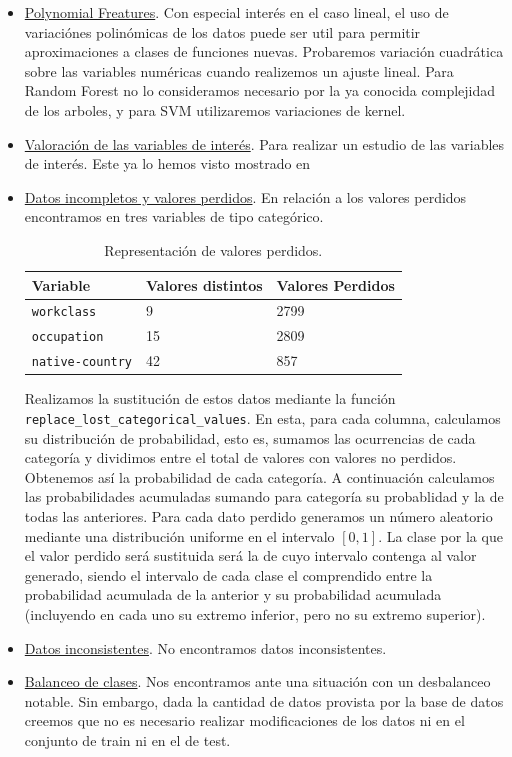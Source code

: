 \documentclass[11pt,a4paper]{article}
\begin{document}
\begin{itemize}
\begin{itemize}
\end{itemize}
\newpage
\item  \underline{Polynomial Freatures}. Con especial interés en el caso lineal, el uso de variaciónes polinómicas de los datos puede ser util para permitir aproximaciones a clases de funciones nuevas. Probaremos variación cuadrática sobre las variables numéricas cuando realizemos un ajuste lineal. Para Random Forest no lo consideramos necesario por la ya conocida complejidad de los arboles, y para SVM utilizaremos variaciones de kernel. \\
	
	\item \underline{Valoración de las variables de interés}. Para realizar un estudio de las variables de interés. Este ya lo hemos visto mostrado en 
	\item \underline{Datos incompletos y valores perdidos}. En relación a los valores perdidos encontramos en tres variables de tipo categórico.\\
	
\begin{table}[h]
\begin{center}
\begin{tabular}{|l|ll|}
\hline
Variable& Valores distintos & Valores Perdidos\\ \hline
\texttt{workclass} & 9 & 2799\\
\texttt{occupation} & 15 & 2809\\
\texttt{native-country} & 42 & 857\\\hline
\end{tabular}
\end{center}
\caption{Representación de valores perdidos.}
	\end{table}
	
	Realizamos la sustitución de estos datos mediante la función \texttt{replace\_lost\_categorical\_values}. En esta, para cada columna, calculamos su distribución de probabilidad, esto es, sumamos las ocurrencias de cada categoría y dividimos entre el total de valores con valores no perdidos. Obtenemos así la probabilidad de cada categoría. A continuación calculamos las probabilidades acumuladas sumando para categoría su probablidad y la de todas las anteriores. Para cada dato perdido generamos un número aleatorio mediante una distribución uniforme en el intervalo $[0,1]$. La clase por la que el valor perdido será sustituida será la de cuyo intervalo contenga al valor generado, siendo el intervalo de cada clase el comprendido entre la probabilidad acumulada de la anterior y su probabilidad acumulada (incluyendo en cada uno su extremo inferior, pero no su extremo superior).
	
	\item \underline{Datos inconsistentes}. No encontramos datos inconsistentes.
	\item \underline{Balanceo de clases}. Nos encontramos ante una situación con un desbalanceo notable. Sin embargo, dada la cantidad de datos provista por la base de datos creemos que no es necesario realizar modificaciones de los datos ni en el conjunto de train ni en el de test.
\end{itemize}
\end{document}
